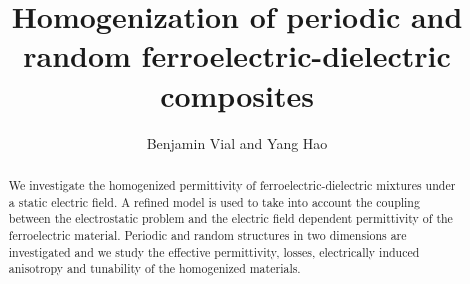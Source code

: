 \documentclass[openacc]{rsproca_new}%
\begin{document}
\title{Homogenization of periodic and random ferroelectric-dielectric composites}
\author{Benjamin Vial and Yang Hao}

\address{School of Engineering and Computer Science, Queen Mary, University of London, London, E1 4NS, United Kingdom}

\subject{xxxxx, xxxxx, xxxx}



\begin{abstract}
  We investigate the homogenized permittivity of ferroelectric-dielectric mixtures under
  a static electric field. A refined model is used to take into account the coupling
  between the electrostatic problem and the electric field dependent permittivity of the
  ferroelectric material. Periodic and random structures in two dimensions are investigated and
  we study the effective permittivity, losses, electrically induced anisotropy and tunability
   of the homogenized materials.
\end{abstract}

\end{document}

